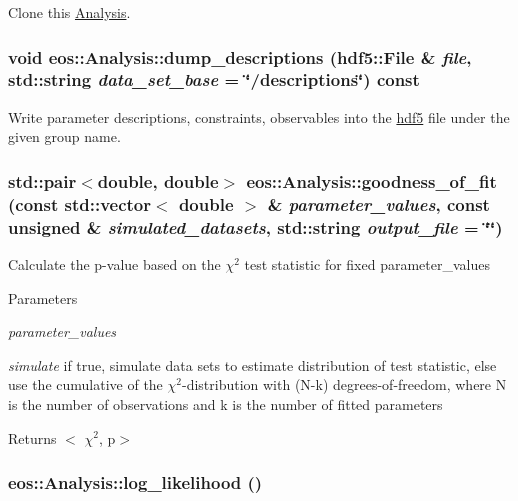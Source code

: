 Clone this \hyperlink{classeos_1_1Analysis}{Analysis}. \hypertarget{classeos_1_1Analysis_a444e11133ea75c88fb2579f1ac73c8c3}{
\subsubsection[{dump\_\-descriptions}]{\setlength{\rightskip}{0pt plus 5cm}void eos::Analysis::dump\_\-descriptions ({\bf hdf5::File} \& {\em file}, \/  std::string {\em data\_\-set\_\-base} = {\ttfamily \char`\"{}/descriptions\char`\"{}}) const}}
\label{classeos_1_1Analysis_a444e11133ea75c88fb2579f1ac73c8c3}
Write parameter descriptions, constraints, observables into the \hyperlink{namespaceeos_1_1hdf5}{hdf5} file under the given group name. \hypertarget{classeos_1_1Analysis_a7146dc3458d035af4546890b0795146b}{
\subsubsection[{goodness\_\-of\_\-fit}]{\setlength{\rightskip}{0pt plus 5cm}std::pair$<$double, double$>$ eos::Analysis::goodness\_\-of\_\-fit (const std::vector$<$ double $>$ \& {\em parameter\_\-values}, \/  const unsigned \& {\em simulated\_\-datasets}, \/  std::string {\em output\_\-file} = {\ttfamily \char`\"{}\char`\"{}})}}
\label{classeos_1_1Analysis_a7146dc3458d035af4546890b0795146b}
Calculate the p-\/value based on the $\chi^2 $ test statistic for fixed parameter\_\-values 
\begin{DoxyParams}{Parameters}
\item[{\em parameter\_\-values}]\item[{\em simulate}]if true, simulate data sets to estimate distribution of test statistic, else use the cumulative of the $\chi^2 $-\/distribution with (N-\/k) degrees-\/of-\/freedom, where N is the number of observations and k is the number of fitted parameters \end{DoxyParams}
\begin{DoxyReturn}{Returns}
$<$ $\chi^2 $, p$>$ 
\end{DoxyReturn}
\hypertarget{classeos_1_1Analysis_a29da23044cd892ac972ed62262276445}{
\subsubsection[{log\_\-likelihood}]{ eos::Analysis::log\_\-likelihood ()}}
\label{classeos_1_1Analysis_a29da23044cd892ac972ed62262276445}


